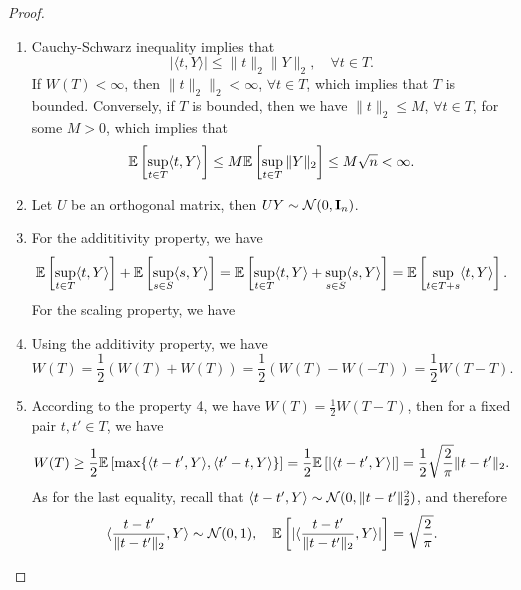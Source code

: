 \begin{proof}
	\begin{enumerate}
		\item Cauchy-Schwarz inequality implies that
		      \begin{equation*}
			      |\langle t,Y\rangle|\leq\|t\|_{2}\|Y\|_{2},\quad\forall t\in T.
		      \end{equation*}
		      If \(W(T)<\infty\), then \(\|t\|_{2}\|_{2}<\infty\), \(\forall t\in T\), which implies that \(T\) is bounded. Conversely, if \(T\) is bounded, then we have \(\|t\|_{2}\leq M\), \(\forall t\in T\), for some \(M>0\), which implies that
		      \begin{equation*}
			      \mathbb{E}\left[\sup_{t\in T}\langle t,Y\rangle\right]\leq M\mathbb{E}\left[\sup_{t\in T}\|Y\|_{2}\right]\leq M\sqrt{n}<\infty.
		      \end{equation*}
		\item Let \(U\) be an orthogonal matrix, then \(UY\sim\mathcal{N}(0,\mathbf{I}_{n})\).
		\item For the addititivity property, we have
		      \begin{equation*}
			      \mathbb{E}\left[\sup_{t\in T}\langle t,Y\rangle\right]+\mathbb{E}\left[\sup_{s\in S}\langle s,Y\rangle\right]=\mathbb{E}\left[\sup_{t\in T}\langle t,Y\rangle+\sup_{s\in S}\langle s,Y\rangle\right]=\mathbb{E}\left[\sup_{t\in T+s}\langle t,Y\rangle\right].
		      \end{equation*}
		      For the scaling property, we have
		\item Using the additivity property, we have
		      \begin{equation*}
			      W(T)=\frac{1}{2}(W(T)+W(T))=\frac{1}{2}(W(T)-W(-T))=\frac{1}{2}W(T-T).
		      \end{equation*}
		\item According to the property 4, we have \(W(T)=\frac{1}{2}W(T-T)\), then for a fixed pair \(t,t'\in T\), we have
		      \begin{equation*}
			      W(T)\geq \frac{1}{2}\mathbb{E}\left[\max\{\langle t-t',Y\rangle,\langle t'-t,Y\rangle\}\right]=\frac{1}{2}\mathbb{E}\left[|\langle t-t',Y\rangle|\right]=\frac{1}{2}\sqrt{\frac{2}{\pi}}\|t-t'\|_{2}.
		      \end{equation*}
		      As for the last equality, recall that \(\langle t-t',Y\rangle\sim\mathcal{N}(0,\|t-t'\|_{2}^{2})\), and therefore
		      \begin{equation*}
			      \langle \frac{t-t'}{\|t-t'\|_{2}},Y\rangle\sim\mcN(0,1),\quad \bbE\left[|\langle \frac{t-t'}{\|t-t'\|_{2}},Y\rangle|\right]=\sqrt{\frac{2}{\pi}}.

\end{equation*}
\end{enumerate}
\end{proof}

